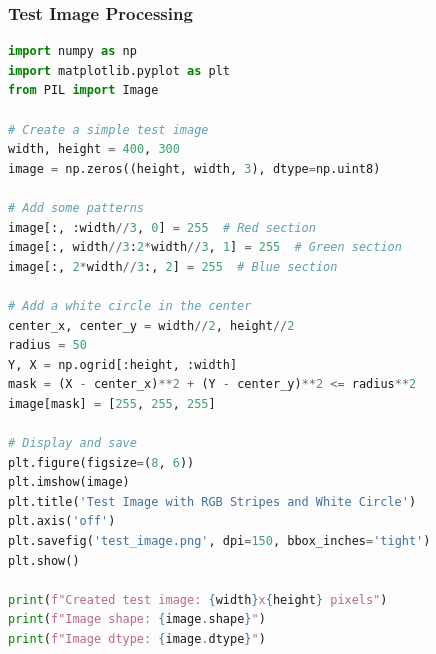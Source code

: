 \documentclass[11pt,a4paper]{article}
\begin{document}
\subsubsection{Test Image Processing}
\begin{lstlisting}[language=Python, caption=Test image processing sederhana]
import numpy as np
import matplotlib.pyplot as plt
from PIL import Image

# Create a simple test image
width, height = 400, 300
image = np.zeros((height, width, 3), dtype=np.uint8)

# Add some patterns
image[:, :width//3, 0] = 255  # Red section
image[:, width//3:2*width//3, 1] = 255  # Green section
image[:, 2*width//3:, 2] = 255  # Blue section

# Add a white circle in the center
center_x, center_y = width//2, height//2
radius = 50
Y, X = np.ogrid[:height, :width]
mask = (X - center_x)**2 + (Y - center_y)**2 <= radius**2
image[mask] = [255, 255, 255]

# Display and save
plt.figure(figsize=(8, 6))
plt.imshow(image)
plt.title('Test Image with RGB Stripes and White Circle')
plt.axis('off')
plt.savefig('test_image.png', dpi=150, bbox_inches='tight')
plt.show()

print(f"Created test image: {width}x{height} pixels")
print(f"Image shape: {image.shape}")
print(f"Image dtype: {image.dtype}")
\end{lstlisting}
\end{document}
